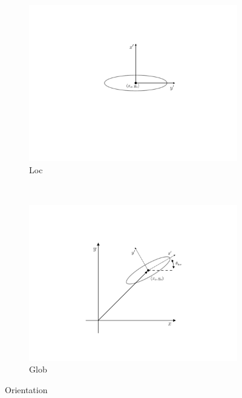 	\begin{figure}[h]
     \centering
     \begin{subfigure}[t]{0.45\textwidth}
             \includegraphics[trim=4.5cm 2.cm 3.5cm 1.5cm, clip, width=\linewidth]{./figures/hybrid/interpolation/ellipse/localOrientation.pdf}
             \caption{Loc}
             \label{fig:localPosition}
     \end{subfigure}%
     ~ %
     \begin{subfigure}[t]{0.45\textwidth}
             \includegraphics[trim=4.5cm 2.cm 3.5cm 1.5cm, clip, width=\linewidth]{./figures/hybrid/interpolation/ellipse/globalOrientation.pdf}
             \caption{Glob}
             \label{fig:globalPosition}
     \end{subfigure}

     \caption{Orientation}
     \label{fig:positionOfBody}
	\end{figure}
	
